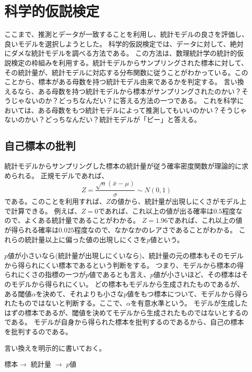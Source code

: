 \chapter{科学的仮説検定}
ここまで、推測とデータが一致することを利用し、統計モデルの良さを評価し、良いモデルを選択しようとした。
科学的仮説検定では、データに対して、絶対にダメな統計モデルを調べる方法である。
この方法は、数理統計学の統計的仮説検定の枠組みを利用する。統計モデルからサンプリングされた標本に対して、その統計量が、統計モデルに対応する分布関数に従うことがわかっている。このことから、標本がある母数を持つ統計モデル由来であるかを判定する。
言い換えるなら、ある母数を持つ統計モデルから標本がサンプリングされたのかい？そうじゃないのか？どっちなんだい？に答える方法の一つである。
これを科学においては、ある母数をもつ統計モデルによって推測してもいいのかい？そうじゃないのかい？どっちなんだい？統計モデルが「ピー」と答える。



\section{自己標本の批判}
統計モデルからサンプリングした標本の統計量が従う確率密度関数が理論的に求められる。
正規モデルであれば、
\begin{equation*}
    Z = \frac{\sqrt{n}(\bar{x}-\mu)}{\sigma} \sim N(0,1)
\end{equation*}
である。このことを利用すれば、$Z$の値から、統計量が出現しにくさがモデル上で計算できる。
例えば、$Z=0$であれば、これ以上の値が出る確率は$0.5$程度なので、よくある統計量であることがわかる。
$Z=1.96$であれば、これ以上の値が得られる確率は$0.025$程度なので、なかなかのレアさであることがわかる。
これらの統計量以上に偏った値の出現しにくさを$p$値という。

$p$値が小さいなら(統計量が出現しにくいなら)、統計量の元の標本もそのモデルから得られにくい標本であるという判断をする。
つまり、モデルから標本の得られにくさの指標の一つが$p$値であるとも言え、$p$値が小さいほど、その標本はそのモデルから得られにくい。
どの標本もモデルから生成されたものであるが、ある閾値$\alpha$を決めて、それよりも小さな$p$値をもつ標本について、モデルから得られたものではないと判断する。ここで、$\alpha$を有意水準という。
モデルが生成したはずの標本であるが、閾値を決めてモデルから生成されたものではないとするのである。
モデルが自身から得られた標本を批判するのであるから、自己の標本を批判するのである。

言い換えを明示的に書いておく。
\begin{center}
    標本$\rightarrow$ 統計量 $\rightarrow$ $p$値
\end{center}

